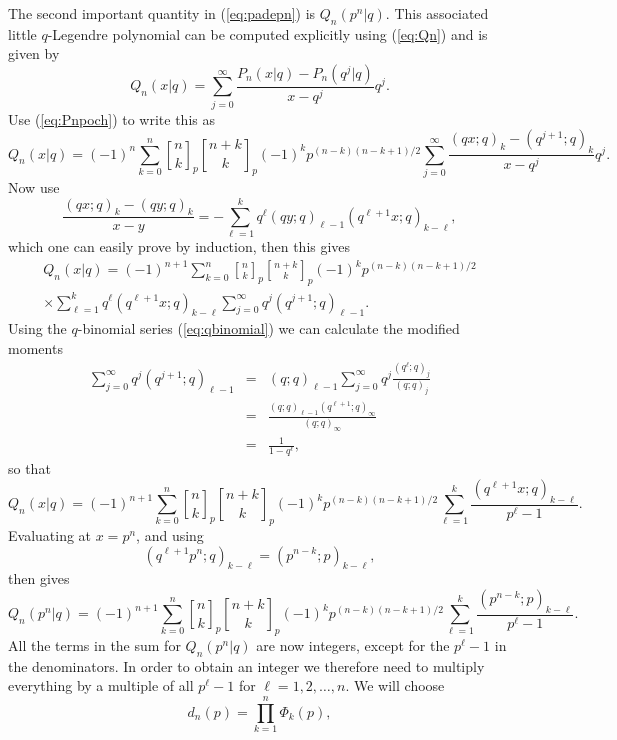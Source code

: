 \documentclass[12pt]{article}
\DeclareRobustCommand{\qbinom}{\genfrac[]{0pt}{}}
\begin{document}
The second important quantity in (\ref{eq:padepn}) is $Q_n(p^n|q)$. This
associated little $q$-Legendre polynomial can be computed explicitly using
(\ref{eq:Qn}) and is given by
\[  Q_n(x|q) = \sum_{j=0}^\infty \frac{P_n(x|q)-P_n(q^j|q)}{x-q^j} q^j. \]
Use (\ref{eq:Pnpoch}) to write this as
\[  Q_n(x|q) = (-1)^n \sum_{k=0}^{n} \qbinom{n}{k}_p \qbinom{n+k}{k}_p (-1)^k
   p^{(n-k)(n-k+1)/2}   \sum_{j=0}^\infty \frac{(qx;q)_k-(q^{j+1};q)_k}{x-q^j} q^j. \]
Now use
\[   \frac{(qx;q)_k - (qy;q)_k}{x-y} = - \sum_{\ell=1}^k q^\ell (qy;q)_{\ell-1}
(q^{\ell+1}x;q)_{k-\ell} , \]
which one can easily prove by induction,
then this gives
\begin{multline*}
 Q_n(x|q) =  (-1)^{n+1} \sum_{k=0}^n \qbinom{n}{k}_p \qbinom{n+k}{k}_p (-1)^k
                  p^{(n-k)(n-k+1)/2}  \\
           \times       \sum_{\ell=1}^{k} q^\ell (q^{\ell+1}x;q)_{k-\ell}
                   \sum_{j=0}^\infty q^j (q^{j+1};q)_{\ell-1}. 
\end{multline*}
Using the $q$-binomial series (\ref{eq:qbinomial}) we
can calculate the modified moments
\begin{eqnarray*} 
  \sum_{j=0}^\infty q^j (q^{j+1};q)_{\ell-1} & = & (q;q)_{\ell-1}
   \sum_{j=0}^\infty q^j \frac{(q^\ell;q)_j}{(q;q)_j} \\
  & = & \frac{(q;q)_{\ell-1} (q^{\ell+1};q)_\infty}{(q;q)_\infty} \\
  & = & \frac{1}{1-q^\ell}, 
\end{eqnarray*}
so that
\begin{equation} \label{eq:Qnx}
  Q_n(x|q) = (-1)^{n+1} \sum_{k=0}^n \qbinom{n}{k}_p \qbinom{n+k}{k}_p (-1)^k
                  p^{(n-k)(n-k+1)/2} \sum_{\ell=1}^{k} \frac{(q^{\ell+1}x;q)_{k-\ell}}{p^\ell-1} . 
\end{equation}                            
Evaluating at $x=p^n$, and using 
\[  (q^{\ell+1}p^n;q)_{k-\ell} = (p^{n-k};p)_{k-\ell}, \]
then gives
\begin{equation}  \label{eq:Qnpn}
  Q_n(p^n|q) = (-1)^{n+1} \sum_{k=0}^n \qbinom{n}{k}_p \qbinom{n+k}{k}_p (-1)^k p^{(n-k)(n-k+1)/2}
                   \sum_{\ell=1}^{k} \frac{(p^{n-k};p)_{k-\ell}}{p^\ell-1}.
\end{equation}
 All the terms
in the sum for $Q_n(p^n|q)$ are now integers, except
for the $p^{\ell}-1$ in the denominators. In order to obtain an integer
we therefore need to multiply everything by a multiple of
all $p^{\ell}-1$ for $\ell=1,2,\ldots,n$. 
We will choose
\begin{equation}  \label{eq:lcm}
  d_n(p) = \prod_{k=1}^n \Phi_k(p),
\end{equation}  
\end{document}
